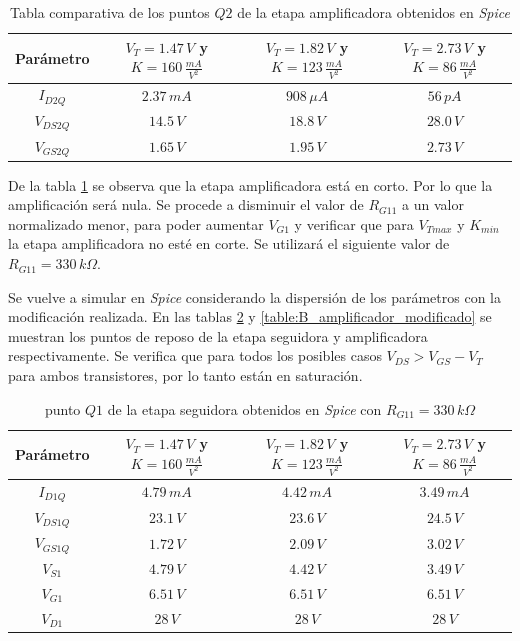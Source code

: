 \documentclass[10pt,spanish,a4paper,notitlepage]{article}
\begin{document}
\begin{table}[H]
\centering
\begin{tabular}{|c|c|c|c|} 
\hline
Parámetro & $V_{T}=1.47\,\unit{V}$ y $K=160\,\unit{\frac{mA}{V^2}}$ & 
$V_{T}=1.82\,\unit{V}$ y $K=123\,\unit{\frac{mA}{V^2}}$ &
$V_{T}=2.73\,\unit{V}$ y $K=86\,\unit{\frac{mA}{V^2}}$ \\ \hline
$I_{D2Q}$ & $2.37\,\unit{mA}$ & $908\,\unit{\mu A}$ & $56\,\unit{pA}$\\ \hline
$V_{DS2Q}$ & $14.5\,\unit{V}$ & $18.8\,\unit{V}$ & $28.0\,\unit{V}$\\ \hline
$V_{GS2Q}$ & $1.65\,\unit{V}$  & $1.95\,\unit{V}$ & $2.73\,\unit{V}$\\ \hline
\end{tabular}
\caption{Tabla comparativa de los puntos $Q2$ de la etapa amplificadora obtenidos en \emph{Spice}}
\label{table:B_amplificador}
\end{table}

De la tabla \ref{table:B_amplificador} se observa que la etapa amplificadora está
en corto. Por lo que la amplificación será nula.
Se procede a disminuir el valor de $R_{G11}$ a un valor normalizado menor, para
poder aumentar $V_{G1}$ y verificar que para $V_{Tmax}$ y $K_{min}$ la etapa
amplificadora no esté en corte.
Se utilizará el siguiente valor de  $R_{G11} = 330\,\unit{k\Omega}$.

Se vuelve a simular en \emph{Spice} considerando la dispersión de los parámetros
con la modificación realizada. En las tablas \ref{table:B_seguidor_modificado} y \ref{table:B_amplificador_modificado} se muestran los puntos 
de reposo de la etapa seguidora y amplificadora respectivamente.
Se verifica que para todos los posibles casos $V_{DS} > V_{GS} - V_T$ para ambos transistores, por lo tanto están en saturación.

\begin{table}[H]
\centering
\begin{tabular}{|c|c|c|c|} 
\hline
Parámetro & $V_{T}=1.47\,\unit{V}$ y $K=160\,\unit{\frac{mA}{V^2}}$ & 
$V_{T}=1.82\,\unit{V}$ y $K=123\,\unit{\frac{mA}{V^2}}$ &
$V_{T}=2.73\,\unit{V}$ y $K=86\,\unit{\frac{mA}{V^2}}$ \\ \hline
$I_{D1Q}$ & $4.79\,\unit{mA}$ & $4.42\,\unit{mA}$ & $3.49\,\unit{mA}$\\ \hline
$V_{DS1Q}$ & $23.1\,\unit{V}$ & $23.6\,\unit{V}$ & $24.5\,\unit{V}$\\ \hline
$V_{GS1Q}$ & $1.72\,\unit{V}$  & $2.09\,\unit{V}$ & $3.02\,\unit{V}$\\ \hline
$V_{S1}$ & $4.79\,\unit{V}$  & $4.42\,\unit{V}$ & $3.49\,\unit{V}$\\ \hline
$V_{G1}$ & $6.51\,\unit{V}$  & $6.51\,\unit{V}$ & $6.51\,\unit{V}$\\ \hline
$V_{D1}$ & $28\,\unit{V}$  & $28\,\unit{V}$ & $28\,\unit{V}$\\ \hline
\end{tabular}
\caption{punto $Q1$ de la etapa seguidora obtenidos en \emph{Spice} con $R_{G11} = 330\,\unit{k\Omega}$}
\label{table:B_seguidor_modificado}
\end{table}
\end{document}
